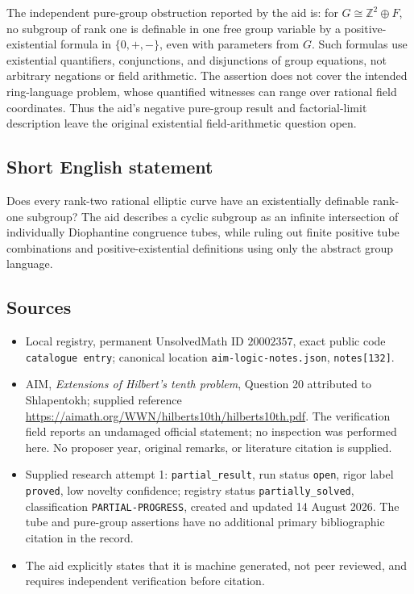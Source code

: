 \documentclass[11pt]{article}
\newcommand{\Z}{\mathbb{Z}}
\begin{document}
The independent pure-group obstruction reported by the aid is: for \(G\cong\Z^2\oplus F\), no subgroup of rank one is definable in one free group variable by a positive-existential formula in \(\{0,+,-\}\), even with parameters from \(G\). Such formulas use existential quantifiers, conjunctions, and disjunctions of group equations, not arbitrary negations or field arithmetic. The assertion does not cover the intended ring-language problem, whose quantified witnesses can range over rational field coordinates. Thus the aid's negative pure-group result and factorial-limit description leave the original existential field-arithmetic question open.
\subsection{Short English statement}
Does every rank-two rational elliptic curve have an existentially definable rank-one subgroup? The aid describes a cyclic subgroup as an infinite intersection of individually Diophantine congruence tubes, while ruling out finite positive tube combinations and positive-existential definitions using only the abstract group language.
\subsection{Sources}
\begin{itemize}
\item Local registry, permanent UnsolvedMath ID \(20002357\), exact public code \texttt{catalogue entry}; canonical location \texttt{aim-logic-notes.json}, \texttt{notes[132]}.
\item AIM, \emph{Extensions of Hilbert's tenth problem}, Question 20 attributed to Shlapentokh; supplied reference \url{https://aimath.org/WWN/hilberts10th/hilberts10th.pdf}. The verification field reports an undamaged official statement; no inspection was performed here. No proposer year, original remarks, or literature citation is supplied.
\item Supplied research attempt 1: \texttt{partial\_result}, run status \texttt{open}, rigor label \texttt{proved}, low novelty confidence; registry status \texttt{partially\_solved}, classification \texttt{PARTIAL-PROGRESS}, created and updated 14 August 2026. The tube and pure-group assertions have no additional primary bibliographic citation in the record.
\item The aid explicitly states that it is machine generated, not peer reviewed, and requires independent verification before citation.
\end{itemize}
\end{document}
